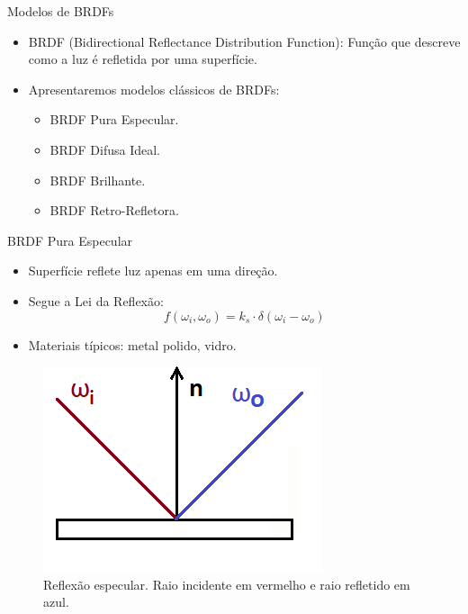 \begin{frame}{Modelos de BRDFs}
    \begin{itemize}
        \item BRDF (Bidirectional Reflectance Distribution Function):  
              Função que descreve como a luz é refletida por uma superfície.
        \item Apresentaremos modelos clássicos de BRDFs:
        \begin{itemize}
            \item BRDF Pura Especular.
            \item BRDF Difusa Ideal.
            \item BRDF Brilhante.
            \item BRDF Retro-Refletora.
        \end{itemize}
    \end{itemize}
\end{frame}

\begin{frame}{BRDF Pura Especular}
    \begin{itemize}
        \item Superfície reflete luz apenas em uma direção.
        \item Segue a Lei da Reflexão:
        \[
        f(\omega_i, \omega_o) = k_s \cdot \delta(\omega_i - \omega_o)
        \]
        \item Materiais típicos: metal polido, vidro.
    \end{itemize}
    \begin{figure}[H]
        \centering
        \includegraphics[scale=0.5]{./Imagens/specular-2d.png}
        \caption{\small Reflexão especular. Raio incidente em vermelho e raio refletido em azul.}
    \end{figure}
\end{frame}

